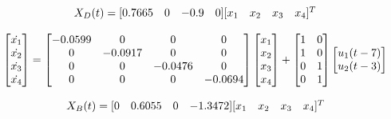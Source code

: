 \begin{equation}
    \centering
    X_D(t) =  
    \begin{matrix}
        [0.7665 & 0 & -0.9 & 0]
    \end{matrix}
    \begin{matrix}
        [x_1 & x_2 & x_3 & x_4]^T
    \end{matrix}
    \label{eq: X_D_output}
\end{equation}

\begin{equation}
    \centering
    \begin{bmatrix}
        \dot{x_1} \\
        \dot{x_2} \\
        \dot{x_3} \\
        \dot{x_4} 
    \end{bmatrix}
    =
    \begin{bmatrix}
        -0.0599     &     0     &     0     &     0 \\
        0           &  -0.0917  &     0     &     0 \\
        0           &     0     &   -0.0476 &     0 \\
        0           &     0     &     0     &  -0.0694
    \end{bmatrix}
    \begin{bmatrix}
        x_1 \\
        x_2 \\
        x_3 \\
        x_4 
    \end{bmatrix}
    +
    \begin{bmatrix}
        1     &     0  \\
        1     &     0  \\
        0     &     1  \\
        0     &     1
    \end{bmatrix}
    \begin{bmatrix}
        u_1(t - 7) \\
        u_2(t - 3)
    \end{bmatrix}
    \label{eq: x_ss_eq2}
\end{equation}

\begin{equation}
    \centering
    X_B(t) =  
    \begin{matrix}
        [0 & 0.6055 & 0 & -1.3472]
    \end{matrix}
    \begin{matrix}
        [x_1 & x_2 & x_3 & x_4]^T
    \end{matrix}
    \label{eq: X_B_output}
\end{equation}

